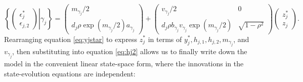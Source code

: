 \begin{equation}
		\left\{ \left. \left( \begin{array}{c} \epsilon_{j}^{*} \\ \epsilon_{j,2} \end{array} \right) \right| \gamma_j \right\} = \left( \begin{array}{c} m_{\gamma_j}/2 \\ d_j \rho \exp(m_{\gamma_j}/2) a_{\gamma_j}  \end{array} \right) + \left( \begin{array}{cc} v_{\gamma_j}/2 & 0 \\ d_j \rho b_{\gamma_j} v_{\gamma_j} \exp(m_{\gamma_j}/2) & \sqrt{1-\rho^2}  \end{array} \right) \left( \begin{array}{c} z_j^* \\ z_j \end{array} \right).
\end{equation}
Rearranging equation \eqref{eq:yjstar} to express $z_j^*$ in terms of $y_j^*, h_{j,1}, h_{j,2}, m_{\gamma_j}$, and $v_{\gamma_j}$, then substituting into equation \eqref{eq:hj2} allows us to finally write down the model in the convenient linear state-space form, where the innovations in the state-evolution equations are independent:
